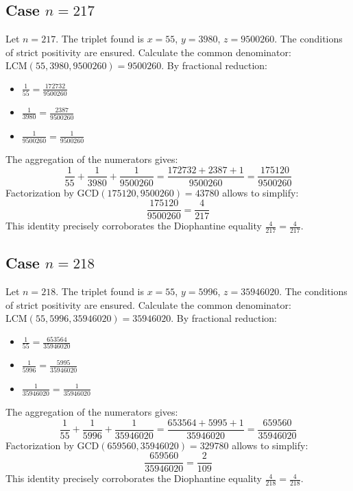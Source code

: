 \documentclass[11pt,a4paper]{article}
\begin{document}
\subsection{Case $n = 217$}
Let $n = 217$. The triplet found is $x = 55$, $y = 3980$, $z = 9500260$.
The conditions of strict positivity are ensured.
Calculate the common denominator: $\text{LCM}(55, 3980, 9500260) = 9500260$.
By fractional reduction:
\begin{itemize}
    \item $\frac{1}{55} = \frac{172732}{9500260}$
    \item $\frac{1}{3980} = \frac{2387}{9500260}$
    \item $\frac{1}{9500260} = \frac{1}{9500260}$
\end{itemize}
The aggregation of the numerators gives:
$$ \frac{1}{55} + \frac{1}{3980} + \frac{1}{9500260} = \frac{172732 + 2387 + 1}{9500260} = \frac{175120}{9500260} $$
Factorization by $\text{GCD}(175120, 9500260) = 43780$ allows to simplify:
$$ \frac{175120}{9500260} = \frac{4}{217} $$
This identity precisely corroborates the Diophantine equality $\frac{4}{217} = \frac{4}{217}$.

\subsection{Case $n = 218$}
Let $n = 218$. The triplet found is $x = 55$, $y = 5996$, $z = 35946020$.
The conditions of strict positivity are ensured.
Calculate the common denominator: $\text{LCM}(55, 5996, 35946020) = 35946020$.
By fractional reduction:
\begin{itemize}
    \item $\frac{1}{55} = \frac{653564}{35946020}$
    \item $\frac{1}{5996} = \frac{5995}{35946020}$
    \item $\frac{1}{35946020} = \frac{1}{35946020}$
\end{itemize}
The aggregation of the numerators gives:
$$ \frac{1}{55} + \frac{1}{5996} + \frac{1}{35946020} = \frac{653564 + 5995 + 1}{35946020} = \frac{659560}{35946020} $$
Factorization by $\text{GCD}(659560, 35946020) = 329780$ allows to simplify:
$$ \frac{659560}{35946020} = \frac{2}{109} $$
This identity precisely corroborates the Diophantine equality $\frac{4}{218} = \frac{4}{218}$.
\end{document}
